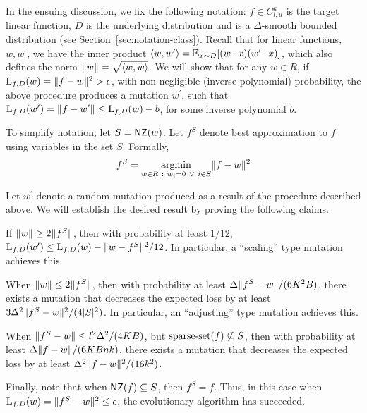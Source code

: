 In the ensuing discussion, we fix the following notation: $f \in C^k_{l, u}$ is
the target linear function, $D$ is the underlying distribution and is a
$\Delta$-smooth bounded distribution (see Section~\ref{sec:notation-class}). Recall
that for linear functions, $w, w^\prime$, we have the inner product
$\langle w, w^\prime \rangle = \mathbb{E}_{x \sim D}[(w \cdot x) (w^\prime \cdot x)]$, which also
defines the norm $\Vert w \Vert = \sqrt{\langle w, w \rangle}$.  We will show that for any
$w \in R$, if $\mathrm{L}_{f, D}(w) = \Vert f - w \Vert^2 > \epsilon$, with non-negligible
(inverse polynomial) probability, the above procedure produces a mutation
$w^\prime$, such that $\mathrm{L}_{f, D}(w^\prime) = \Vert f - w^\prime \Vert \leq
\mathrm{L}_{f, D}(w) - b$, for some inverse polynomial $b$.

To simplify notation, let $S = \mathsf{NZ}(w)$. Let $f^S$ denote best approximation to
$f$ using variables in the set $S$. Formally, 
%
\[ 
f^S = \underset{w \in R ~:~ w_i = 0 ~\vee~ i \in S} {\mathrm{argmin}} \Vert f- w \Vert^2 
\]

Let $w^\prime$ denote a random mutation produced as a result of the procedure
described above.  We will establish the desired result by proving the following
claims.
\begin{claim} \label{claim:apple} If $\Vert w \Vert \geq 2 \Vert f^S \Vert$, then
with probability at least $1/12$, $\mathrm{L}_{f, D}(w^\prime) \leq \mathrm{L}_{f, D}(w) -
\Vert w - f^S \Vert^2/12$. In particular, a ``scaling'' type mutation achieves
this. \end{claim}
\begin{claim} \label{claim:banana} When $\Vert w \Vert \leq 2 \Vert f^S \Vert$,
then with probability at least $\Delta \Vert f^S - w \Vert/(6K^2 B)$, there
exists a mutation that decreases the expected loss by at least $3
\Delta^2\Vert f^S - w \Vert^2/(4|S|^2)$. In particular, an ``adjusting'' type
mutation achieves this. \end{claim}
\begin{claim} \label{claim:cantaloupe} When $\Vert f^S - w \Vert \leq
l^2\Delta^2/(4KB)$, but $\mathrm{sparse\mbox{-}set}(f) \not\subseteq S$, then with probability
at least $\Delta \Vert f - w \Vert/(6KBnk)$, there exists a mutation that
decreases the expected loss by at least $\Delta^2 \Vert f-w \Vert^2/(16k^2)$.
\end{claim}

Finally, note that when $\mathsf{NZ}(f) \subseteq S$, then $f^S = f$. Thus, in this case
when $\mathrm{L}_{f, D}(w) = \Vert f^S - w \Vert^2 \leq \epsilon$, the evolutionary
algorithm has succeeded. \medskip 

